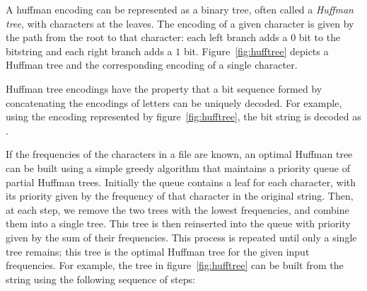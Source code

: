 \documentclass{pset}
\begin{document}
A huffman encoding can be represented as a binary tree, often called a
\emph{Huffman tree}, with characters at the leaves. The encoding of a
given character is given by the path from the root to that character:
each left branch adds a $0$ bit to the bitstring and each right branch
adds a $1$ bit. Figure~\ref{fig:hufftree} depicts a Huffman tree and
the corresponding encoding of a single character.

Huffman tree encodings have the property that a bit sequence formed by
concatenating the encodings of letters can be uniquely decoded. For
example, using the encoding represented by figure~\ref{fig:hufftree},
the bit string  is decoded as .

If the frequencies of the characters in a file are known, an optimal
Huffman tree can be built using a simple greedy algorithm that
maintains a priority queue of partial Huffman trees. Initially the
queue contains a leaf for each character, with its priority given by
the frequency of that character in the original string. Then, at each
step, we remove the two trees with the lowest frequencies, and combine
them into a single tree. This tree is then reinserted into the queue
with priority given by the sum of their frequencies. This process is
repeated until only a single tree remains; this tree is the optimal
Huffman tree for the given input frequencies. For example, the tree in
figure~\ref{fig:hufftree} can be built from the string
 using the following sequence of steps:

\bigskip
\end{document}
